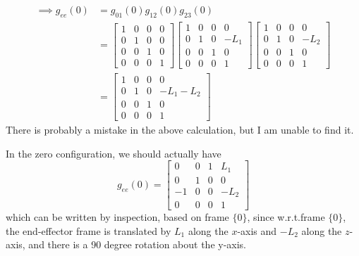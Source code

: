 \begin{align*}
    \implies
    g_{e e}(0)
     & =
    g_{0 1}(0) g_{1 2}(0) g_{2 3}(0)
    \\ & =
    \begin{bmatrix}
        1 & 0 & 0 & 0 \\
        0 & 1 & 0 & 0 \\
        0 & 0 & 1 & 0 \\
        0 & 0 & 0 & 1
    \end{bmatrix}
    \begin{bmatrix}
        1 & 0 & 0 & 0    \\
        0 & 1 & 0 & -L_1 \\
        0 & 0 & 1 & 0    \\
        0 & 0 & 0 & 1
    \end{bmatrix}
    \begin{bmatrix}
        1 & 0 & 0 & 0    \\
        0 & 1 & 0 & -L_2 \\
        0 & 0 & 1 & 0    \\
        0 & 0 & 0 & 1
    \end{bmatrix}
    \\ & =
    \begin{bmatrix}
        1 & 0 & 0 & 0        \\
        0 & 1 & 0 & -L_1-L_2 \\
        0 & 0 & 1 & 0        \\
        0 & 0 & 0 & 1
    \end{bmatrix}
\end{align*}
There is probably a mistake in the above calculation, but I am unable to find it.

\clearpage
In the zero configuration, we should actually have
\begin{equation*}
    \boxed{
        g_{e e}(0)
        =
        \begin{bmatrix}
            0  & 0 & 1 & L_1  \\
            0  & 1 & 0 & 0    \\
            -1 & 0 & 0 & -L_2 \\
            0  & 0 & 0 & 1
        \end{bmatrix}
    }
\end{equation*}
which can be written by inspection, based on frame \( \{0\} \), since w.r.t.\@ frame \( \{0\} \), the end-effector frame is translated by \( L_1 \) along the \( x \)-axis and \( -L_2 \) along the \( z \)-axis, and there is a 90 degree rotation about the y-axis.

